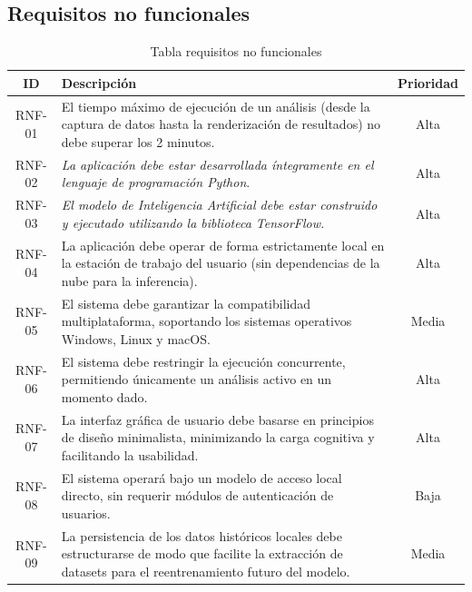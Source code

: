\subsection{Requisitos no funcionales}
\begin{table}[H]
    \centering
    \begin{tabular}{|c|p{9cm}|c|}
        \hline
        \textbf{ID} & \textbf{Descripción} & \textbf{Prioridad} \\ \hline
        RNF-01 & El tiempo máximo de ejecución de un análisis (desde la captura de datos hasta la renderización de resultados) no debe superar los 2 minutos. & Alta \\ \hline
        RNF-02 & \textit{La aplicación debe estar desarrollada íntegramente en el lenguaje de programación Python}. & Alta \\ \hline
        RNF-03 & \textit{El modelo de Inteligencia Artificial debe estar construido y ejecutado utilizando la biblioteca TensorFlow.} & Alta \\ \hline
        RNF-04 & La aplicación debe operar de forma estrictamente local en la estación de trabajo del usuario (sin dependencias de la nube para la inferencia). & Alta \\ \hline
        RNF-05 & El sistema debe garantizar la compatibilidad multiplataforma, soportando los sistemas operativos Windows, Linux y macOS. & Media \\ \hline
        RNF-06 & El sistema debe restringir la ejecución concurrente, permitiendo únicamente un análisis activo en un momento dado. & Alta \\ \hline
        RNF-07 & La interfaz gráfica de usuario debe basarse en principios de diseño minimalista, minimizando la carga cognitiva y facilitando la usabilidad. & Alta \\ \hline
        RNF-08 & El sistema operará bajo un modelo de acceso local directo, sin requerir módulos de autenticación de usuarios. & Baja \\ \hline
        RNF-09 & La persistencia de los datos históricos locales debe estructurarse de modo que facilite la extracción de datasets para el reentrenamiento futuro del modelo. & Media \\ \hline
    \end{tabular}
    \caption{Tabla requisitos no funcionales}
\end{table}
\newpage
